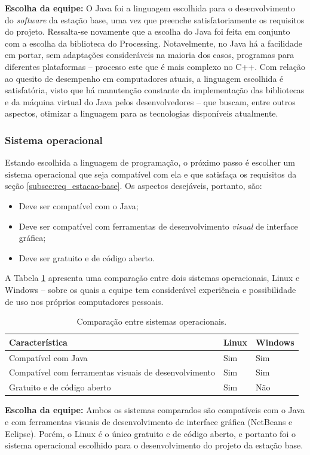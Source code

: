 \textbf{Escolha da equipe:} O Java foi a linguagem escolhida para o desenvolvimento do \textit{software} da estação base, uma vez que preenche satisfatoriamente os requisitos do projeto. Ressalta-se novamente que a escolha do Java foi feita em conjunto com a escolha da biblioteca do Processing. Notavelmente, no Java há a facilidade em portar, sem adaptações consideráveis na maioria dos casos, programas para diferentes plataformas -- processo este que é mais complexo no C++.  Com relação ao quesito de desempenho em computadores atuais, a linguagem escolhida é satisfatória, visto que há manutenção constante da implementação das bibliotecas e da máquina virtual do Java pelos desenvolvedores -- que buscam, entre outros aspectos, otimizar a linguagem para as tecnologias disponíveis atualmente.

\subsubsection{Sistema operacional}

Estando escolhida a linguagem de programação, o próximo passo é escolher um sistema operacional que seja compatível com ela e que satisfaça os requisitos da seção \ref{subsec:req_estacao-base}. Os aspectos desejáveis, portanto, são:

\begin{itemize}
  \item Deve ser compatível com o Java;
  \item Deve ser compatível com ferramentas de desenvolvimento \textit{visual} de interface gráfica;
  \item Deve ser gratuito e de código aberto.
\end{itemize}

A Tabela \ref{tab:alternativas_SO} apresenta uma comparação entre dois sistemas operacionais, Linux e Windows -- sobre os quais a equipe tem considerável experiência e possibilidade de uso nos próprios computadores pessoais.

\begin{table}[h]
  \caption{Comparação entre sistemas operacionais.}
  \centering
  \begin{tabular}{p{6cm}|p{2cm}p{2cm}}
    \toprule
    \textbf{Característica} & \textbf{Linux} & \textbf{Windows} \\
    \hline
    Compatível com Java & Sim & Sim \\
    \hline
    Compatível com ferramentas visuais de desenvolvimento & Sim & Sim \\
    \hline
    Gratuito e de código aberto & Sim & Não \\
    \bottomrule
  \end{tabular}
  \label{tab:alternativas_SO}
\end{table}

\textbf{Escolha da equipe:} Ambos os sistemas comparados são compatíveis com o Java e com ferramentas visuais de desenvolvimento de interface gráfica (NetBeans e Eclipse). Porém, o Linux é o único gratuito e de código aberto, e portanto foi o sistema operacional escolhido para o desenvolvimento do projeto da estação base.



